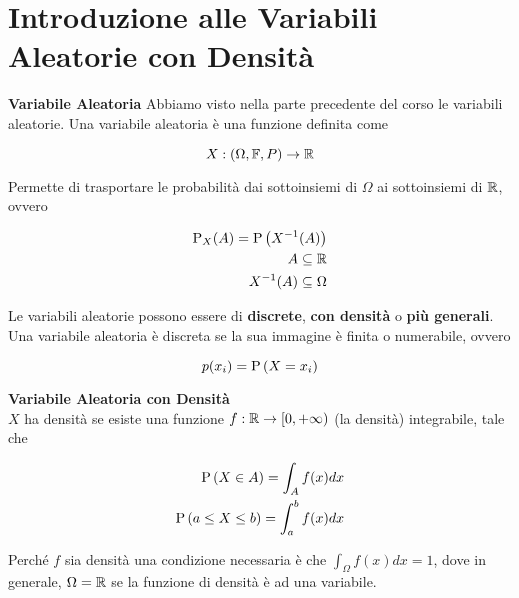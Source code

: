 \section{Introduzione alle Variabili Aleatorie con Densità}
\begin{defn}
    \textbf{Variabile Aleatoria}
    Abbiamo visto nella parte precedente del corso le variabili aleatorie. Una
    variabile aleatoria è una funzione definita come


    \begin{equation*}
        X: (\Omega, \mathbb{F}, P) \to \mathbb{R}
    \end{equation*}

    Permette di trasportare le probabilità dai sottoinsiemi di $ \Omega $ ai
    sottoinsiemi di $ \mathbb{R} $, ovvero


    \begin{equation*}
        \begin{aligned}
            \text{P}_X(A) = \text{P}\left(X^{-1} (A)\right) \\
            A \subseteq \mathbb{R} \\
            X^{-1}(A) \subseteq \Omega
        \end{aligned}
    \end{equation*}

    Le variabili aleatorie possono essere di \textbf{discrete}, \textbf{con
    densità} o \textbf{più generali}. Una variabile aleatoria è discreta se la
    sua immagine è finita o numerabile, ovvero


    \begin{equation*}
        p(x_i) = \text{P}\left(X=x_i\right)
    \end{equation*}
\end{defn}


\begin{defn}
    \label{defn:densita}
    \textbf{Variabile Aleatoria con Densità} \\
    $ X $ ha densità se esiste una funzione $ f : \mathbb{R} \to [0, +\infty) $ (la
    densità) integrabile, tale che

    \begin{equation*}
        \begin{aligned}
            \text{P}\left(X \in A\right) = \int_A f(x)dx \\
            \text{P}\left(a \leq X \leq b\right) = \int_a^b f(x)dx
        \end{aligned}
    \end{equation*}

    Perché $f$ sia densità una condizione necessaria è che $\int_{\Omega} f(x)
    dx = 1$, dove in generale, $\Omega = \mathbb{R}$ se la funzione di densità è ad una
    variabile.
\end{defn}

